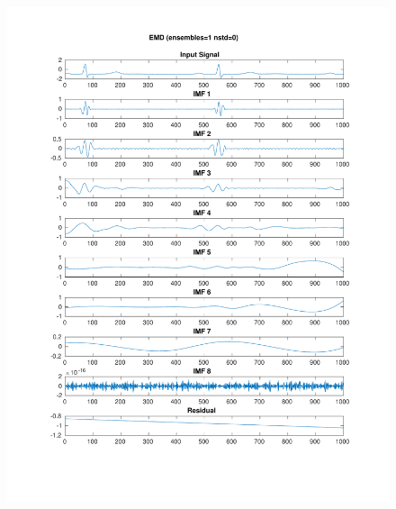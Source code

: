 \documentclass[11pt,a4paper]{article}
\begin{document}
\begin{figure}[H]
\centering
\begin{minipage}{0.48\textwidth}
	\centering
	\includegraphics[width=\textwidth]{fig/123l1_emd.pdf}
\end{minipage}
\begin{minipage}{0.48\textwidth}
	\centering

\end{minipage}
\end{figure}
\end{document}
